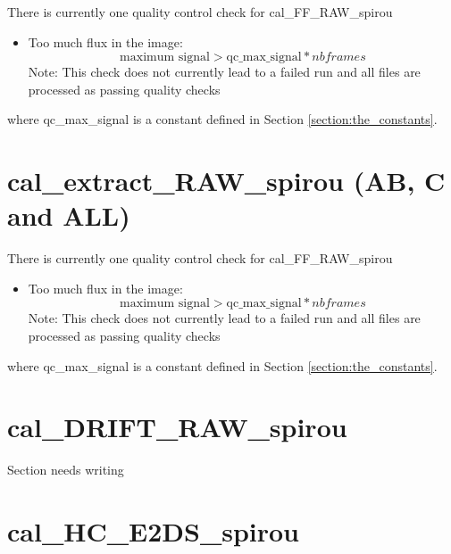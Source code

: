 There is currently one quality control check for cal\_FF\_RAW\_spirou
\begin{itemize}
\item Too much flux in the image: 
	\begin{equation}
	\text{maximum signal} > \text{qc\_max\_signal} * nbframes
	\end{equation}
	\noindent Note: This check does not currently lead to a failed run and all files are processed as passing quality checks
\end{itemize}

\noindent where qc\_max\_signal is a constant defined in Section \ref{section:the_constants}.


\section{cal\_extract\_RAW\_spirou (AB, C and ALL)}
\label{section:qc_cal_extract_RAW_spirou}

There is currently one quality control check for cal\_FF\_RAW\_spirou
\begin{itemize}
\item Too much flux in the image: 
	\begin{equation}
	\text{maximum signal} > \text{qc\_max\_signal} * nbframes
	\end{equation}
	\noindent Note: This check does not currently lead to a failed run and all files are processed as passing quality checks
\end{itemize}

\noindent where qc\_max\_signal is a constant defined in Section \ref{section:the_constants}.



\section{cal\_DRIFT\_RAW\_spirou}
\label{section:qc_cal_DRIFT_RAW_spirou}


Section needs writing



\section{cal\_HC\_E2DS\_spirou}
\label{section:qc_cal_HC_E2DS_spirou}


